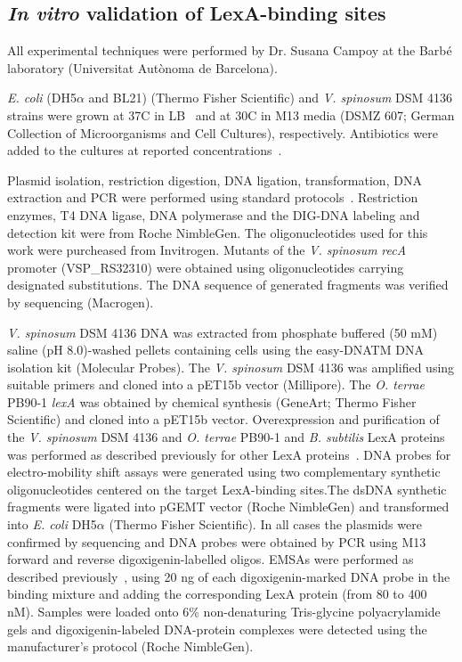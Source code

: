 \subsection{\textit{In vitro} validation of LexA-binding sites}

All experimental techniques were performed by Dr. Susana Campoy at the Barbé
laboratory (Universitat Autònoma de Barcelona).

\textit{E. coli} (DH5$\alpha$ and BL21) (Thermo Fisher Scientific) and
\textit{V. spinosum} DSM 4136 strains were grown at 37\textdegree C in
LB~\citep{green264molecular} and at 30\textdegree C in M13 media (DSMZ 607;
German Collection of Microorganisms and Cell Cultures),
respectively. Antibiotics were added to the cultures at reported
concentrations~\citep{green264molecular}.

Plasmid isolation, restriction digestion, DNA ligation, transformation, DNA
extraction and PCR were performed using standard
protocols~\citep{green264molecular}. Restriction enzymes, T4 DNA ligase, DNA
polymerase and the DIG-DNA labeling and detection kit were from Roche
NimbleGen. The oligonucleotides used for this work were purcheased from
Invitrogen. Mutants of the \textit{V. spinosum} \textit{recA} promoter
(VSP\_RS32310) were obtained using oligonucleotides carrying designated
substitutions. The DNA sequence of generated fragments was verified by
sequencing (Macrogen).

\textit{V. spinosum} DSM 4136 DNA was extracted from phosphate buffered (50 mM)
saline (pH 8.0)-washed pellets containing cells using the easy-DNATM DNA
isolation kit (Molecular Probes). The \textit{V. spinosum} DSM 4136 was
amplified using suitable primers and cloned into a pET15b vector
(Millipore). The \textit{O. terrae} PB90-1 \textit{lexA} was obtained by
chemical synthesis (GeneArt; Thermo Fisher Scientific) and cloned into a pET15b
vector. Overexpression and purification of the \textit{V. spinosum} DSM 4136
and \textit{O. terrae} PB90-1 and \textit{B. subtilis} LexA proteins was
performed as described previously for other LexA
proteins~\citep{cambray2011prevalence, cornish2014characterization}. DNA probes
for electro-mobility shift assays were generated using two complementary
synthetic oligonucleotides centered on the target LexA-binding sites.The dsDNA
synthetic fragments were ligated into pGEMT vector (Roche NimbleGen) and
transformed into \textit{E. coli} DH5$\alpha$ (Thermo Fisher Scientific). In
all cases the plasmids were confirmed by sequencing and DNA probes were
obtained by PCR using M13 forward and reverse digoxigenin-labelled
oligos. EMSAs were performed as described
previously~\citep{sanchez2012analysis}, using 20 ng of each digoxigenin-marked
DNA probe in the binding mixture and adding the corresponding LexA protein
(from 80 to 400 nM). Samples were loaded onto 6\% non-denaturing Tris-glycine
polyacrylamide gels and digoxigenin-labeled DNA-protein complexes were detected
using the manufacturer's protocol (Roche NimbleGen).



